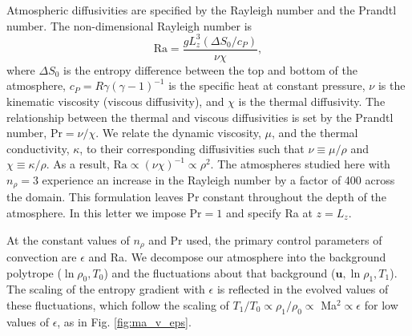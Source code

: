 \documentclass[aps, prl, twocolumn, nofootinbib, groupedaddress, amsfonts, amssymb, amsmath]{revtex4-1}
\begin{document}
Atmospheric diffusivities are specified by the Rayleigh number and the Prandtl number.  The
non-dimensional Rayleigh number is
\begin{equation}
\text{Ra} = \frac{g L_z^3 (\Delta S_0 / c_P)}{\nu\chi},
\end{equation}
where $\Delta S_0$ is the entropy difference between the top and bottom of the atmosphere, 
$c_P = R\gamma(\gamma-1)^{-1}$ is the specific heat at constant pressure,
$\nu$ is the kinematic viscosity (viscous diffusivity), and $\chi$ is the thermal diffusivity.  
The relationship between the thermal and viscous diffusivities is
set by the Prandtl number, $\text{Pr} = \nu/\chi$.   We relate the dynamic viscosity, $\mu$, and the thermal conductivity,
$\kappa$, to their corresponding diffusivities such that 
$\nu \equiv \mu/\rho$ and $\chi \equiv \kappa/\rho$.  As a result, $\text{Ra} \propto (\nu\chi)^{-1} \propto
\rho^2$.  The atmospheres studied here with $n_{\rho} = 3$ experience an increase in the Rayleigh number 
by a factor of 400 across the domain.  This formulation leaves Pr
constant throughout the depth of the atmosphere. In this letter we impose $\text{Pr} = 1$ and
specify Ra at $z = L_z$.  

At the constant values of $n_\rho$ and Pr used, the primary control parameters of convection are $\epsilon$
and Ra.  We decompose our atmosphere into the background polytrope ($\ln\rho_{0}, T_{0}$) and the fluctuations
about that background ($\bm{u}, \ln\rho_{1}, T_{1}$).  The scaling of the entropy gradient with $\epsilon$
is reflected in the evolved values of these fluctuations, which follow the scaling of
$T_1/T_0 \propto \rho_{1}/\rho_{0} \propto$ Ma$^{2} \propto \epsilon$ for low values of $\epsilon$,
as in Fig. \ref{fig:ma_v_eps}.  
\end{document}
